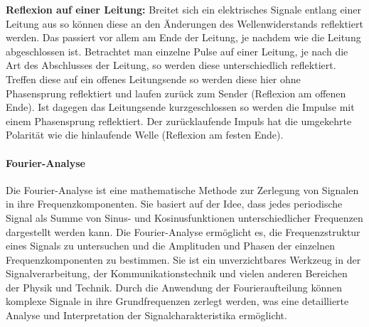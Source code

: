 \documentclass[12pt,a4paper,titlepage]{scrartcl}
\numberwithin{equation}{section}
\numberwithin{table}{section}
\numberwithin{figure}{section}
\begin{document}
\textbf{Reflexion auf einer Leitung:} Breitet sich ein elektrisches Signale entlang
einer Leitung aus so können diese an den Änderungen des Wellenwiderstands reflektiert werden. Das passiert vor allem am Ende der Leitung, je nachdem wie
die Leitung abgeschlossen ist. Betrachtet man einzelne Pulse auf einer Leitung, je nach die Art des Abschlusses der Leitung, so werden diese unterschiedlich reflektiert.
Treffen diese auf ein offenes Leitungsende so werden diese hier ohne Phasensprung reflektiert und laufen zurück zum Sender (Reflexion am offenen Ende).
Ist dagegen das Leitungsende kurzgeschlossen so werden die Impulse mit einem
Phasensprung reflektiert. Der zurücklaufende Impuls hat die umgekehrte Polarität wie die hinlaufende Welle (Reflexion am festen Ende). \cite{PAPskript}

\paragraph{Fourier-Analyse}
Die Fourier-Analyse ist eine mathematische Methode zur Zerlegung von Signalen in ihre Frequenzkomponenten. Sie basiert auf der Idee, dass jedes periodische Signal als Summe von Sinus- und Kosinusfunktionen unterschiedlicher Frequenzen dargestellt werden kann. Die Fourier-Analyse ermöglicht es, die Frequenzstruktur eines Signals zu untersuchen und die Amplituden und Phasen der einzelnen Frequenzkomponenten zu bestimmen. Sie ist ein unverzichtbares Werkzeug in der Signalverarbeitung, der Kommunikationstechnik und vielen anderen Bereichen der Physik und Technik. Durch die Anwendung der Fourieraufteilung können komplexe Signale in ihre Grundfrequenzen zerlegt werden, was eine detaillierte Analyse und Interpretation der Signalcharakteristika ermöglicht.
\end{document}
